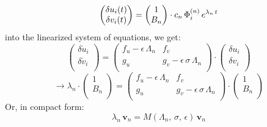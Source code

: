 \begin{equation*}
    \begin{pmatrix}
    \delta u_i (t) \\
    \delta v_i (t) \\
    \end{pmatrix}
    =
    \begin{pmatrix}
        1 \\
        B_n \\
    \end{pmatrix}
    \cdot  c_n\,\Phi_i^{(n)}\, e^{\lambda_n\,t} \\
\end{equation*}
into the linearized system of equations, we get:
\begin{equation*}
    \begin{pmatrix}
        \delta \dot{u}_i \\
        \delta \dot{v}_i \\
    \end{pmatrix}
    =
    \begin{pmatrix}
        f_u - \epsilon\,\Lambda_n & f_v \\
        g_u & g_v -\epsilon\,\sigma\,\Lambda_n \\
    \end{pmatrix}
    \cdot 
        \begin{pmatrix}
        \delta u_i \\
        \delta v_i \\
    \end{pmatrix}
\end{equation*}
\begin{equation*}
    \rightarrow
        \lambda_n \cdot
        \begin{pmatrix}
        1 \\
        B_n\\
    \end{pmatrix}
    =
    \begin{pmatrix}
        f_u - \epsilon\,\Lambda_n & f_v \\
        g_u & g_v -\epsilon\,\sigma\,\Lambda_n \\
    \end{pmatrix}
    \cdot 
        \begin{pmatrix}
        1 \\
        B_n\\
    \end{pmatrix}
\end{equation*}
Or, in compact form:
\begin{equation*}
    \lambda_n\, \mathbf{v}_n = M(\Lambda_n,\,\sigma,\,\epsilon)\, \mathbf{v}_n
\end{equation*}
